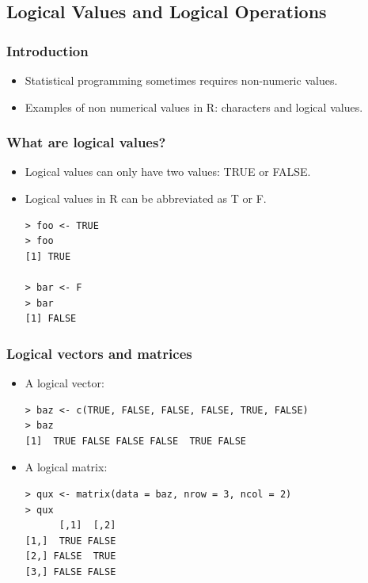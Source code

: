 \documentclass[xcolor=dvipsnames, xcolor=table]{beamer} %
\theoremstyle{mystyle}
\begin{document}
\subsection{Logical Values and Logical Operations}

\begin{frame}[fragile] %
\frametitle{Introduction}
\begin{itemize}
\item Statistical programming sometimes requires non-numeric values. 
\item Examples of non numerical values in R: characters and logical values. 
\end{itemize}

\end{frame}



\begin{frame}[fragile] %
\frametitle{What are logical values?}
\begin{itemize}
\item Logical values can only have two values: TRUE or FALSE.
\item Logical values in R can be abbreviated as T or F.

\begin{verbatim}
> foo <- TRUE
> foo
[1] TRUE

> bar <- F
> bar
[1] FALSE
\end{verbatim}
\end{itemize}
\end{frame}

\begin{frame}[fragile] %

\frametitle{Logical vectors and matrices}

\begin{itemize}

\item A logical vector:

\begin{verbatim}
> baz <- c(TRUE, FALSE, FALSE, FALSE, TRUE, FALSE)
> baz
[1]  TRUE FALSE FALSE FALSE  TRUE FALSE
\end{verbatim}

\item A logical  matrix: 

\begin{verbatim}
> qux <- matrix(data = baz, nrow = 3, ncol = 2)
> qux
      [,1]  [,2]
[1,]  TRUE FALSE
[2,] FALSE  TRUE
[3,] FALSE FALSE
\end{verbatim}

\end{itemize}


\end{frame}
\end{document}
